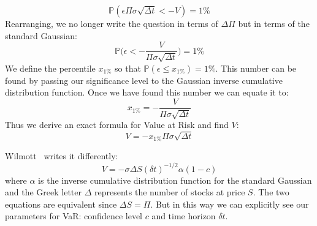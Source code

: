 \documentclass[../analytical_approach.tex]{subfiles}
\begin{document}
\begin{equation}
    \mathbb{P}(\epsilon\Pi\sigma\sqrt{\Delta t}<-V)=1\%
\end{equation}
Rearranging, we no longer write the question in terms of $\Delta\Pi$ but in terms of the standard Gaussian:
\begin{equation}
    \label{eqn:definepercentile}
    \mathbb{P}\bigg(\epsilon<-\frac{V}{\Pi\sigma\sqrt{\Delta t}}\bigg)=1\%
\end{equation}
We define the percentile $x_{1\%}$ so that $\mathbb{P}(\epsilon\leq x_{1\%}) = 1\%$.
This number can be found by passing our significance level to the Gaussian inverse cumulative distribution function.
Once we have found this number we can equate it to:
\begin{equation}
    \label{eqn:percentile}
    x_{1\%}=-\frac{V}{\Pi\sigma\sqrt{\Delta t}}
\end{equation}
Thus we derive an exact formula for Value at Risk and find $V$:
\begin{equation}
    \label{eqn:varsinglestock}
    V =-x_{1\%}\Pi\sigma\sqrt{\Delta t}
\end{equation}

Wilmott~\cite{Wilmott:2007} writes it differently:
\begin{equation}
    \label{eqn:varsinglestock2}
    V =-\sigma\Delta{S}({\delta}{t})^{-1/2}\alpha(1-c)
\end{equation}
where $\alpha$ is the inverse cumulative distribution function for the standard Gaussian and the Greek letter $\Delta$ represents the number of stocks at price $S$.
The two equations are equivalent since $\Delta S = \Pi$.
But in this way we can explicitly see our parameters for VaR: confidence level $c$ and time horizon $\delta t$.
\end{document}

